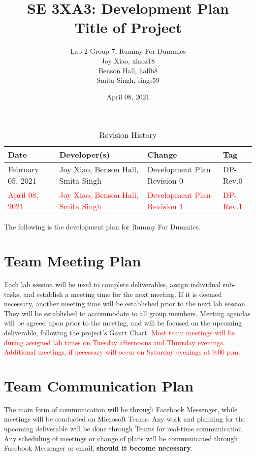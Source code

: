 \documentclass[12pt]{article}
\title{SE 3XA3: Development Plan\\Title of Project}
\author{Lab 2 Group 7, Rummy For Dummies
		\\ Joy Xiao, xiaoz18
		\\ Benson Hall, hallb8
		\\ Smita Singh, sings59
}
\date{April 08, 2021}
\begin{document}
\begin{table}[H]
    \centering
    \caption{Revision History}
    \label{TblRevisionHistory}
    \begin{tabular}{|p{2cm}|p{5cm}|p{5.3cm}|p{2cm}|}
    \hline
    \textbf{Date} & \textbf{Developer(s)} & \textbf{Change} & \textbf{Tag} \\
    \hline
    February 05, 2021 & Joy Xiao, Benson Hall, Smita Singh & Development Plan Revision 0 & DP-Rev.0 \\
    \hline
    \textcolor{red}{April 08, 2021} & \textcolor{red}{Joy Xiao, Benson Hall, Smita Singh} & \textcolor{red}{Development Plan Revision 1} & \textcolor{red}{DP-Rev.1} \\
    \hline
    \end{tabular}
\end{table}

\clearpage

\maketitle

The following is the development plan for Rummy For Dummies.

\section{Team Meeting Plan}
Each lab session will be used to complete deliverables, assign individual sub-tasks, and establish a meeting time for the next meeting. If it is deemed necessary, another meeting time will be established prior to the next lab session. They will be established to accommodate to all group members. Meeting agendas will be agreed upon prior to the meeting, and will be focused on the upcoming deliverable, following the project's Gantt Chart. \textcolor{red}{Most team meetings will be during assigned lab times on Tuesday afternoons and Thursday evenings. Additional meetings, if necessary will occur on Saturday evenings at 9:00 p.m.}

\section{Team Communication Plan}
The main form of communication will be through Facebook Messenger, while meetings will be conducted on Microsoft Teams. Any work and planning for the upcoming deliverable will be done through Teams for real-time communication. Any scheduling of meetings or change of plans will be communicated through Facebook Messenger or email, \textbf{should it become necessary}. 
\end{document}
